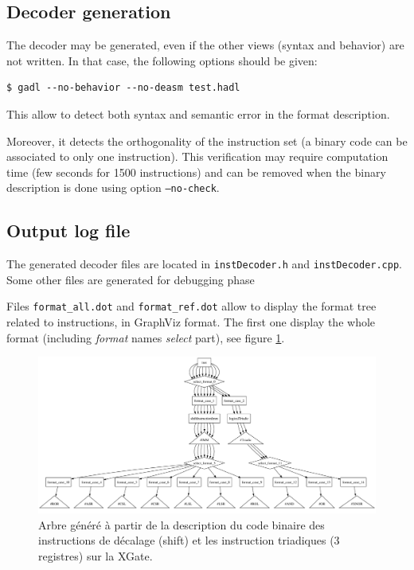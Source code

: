 \subsection{Decoder generation}
The decoder may be generated, even if the other views (syntax and behavior) are not written. In that case, the following options should be given:
\begin{verbatim}
$ gadl --no-behavior --no-deasm test.hadl
\end{verbatim}
This allow to detect both syntax and semantic error in the format description. 

Moreover, it detects the orthogonality of the instruction set (a binary code can be associated to only one instruction). This verification may require computation time (few seconds for 1500 instructions) and can be removed when the binary description is done using option \texttt{--no-check}.

\subsection{Output log file}

The generated decoder files are located in \texttt{instDecoder.h} and \texttt{instDecoder.cpp}. Some other files are generated for debugging phase

Files \texttt{format\_all.dot} and \texttt{format\_ref.dot} allow to display the format tree related to instructions, in GraphViz format. The first one display the whole format (including \emph{format} names \emph{select} part), see figure \ref{fig:formatAllTest}. 

\begin{figure}[h]		%
  \begin{center}
    \includegraphics[width=\linewidth]{../common/images/format_all_test.pdf}
    \caption{Arbre généré à partir de la description du code binaire des instructions de décalage (shift) et les instruction triadiques (3 registres) sur la XGate.}
    \label{fig:formatAllTest}
  \end{center}
\end{figure}



